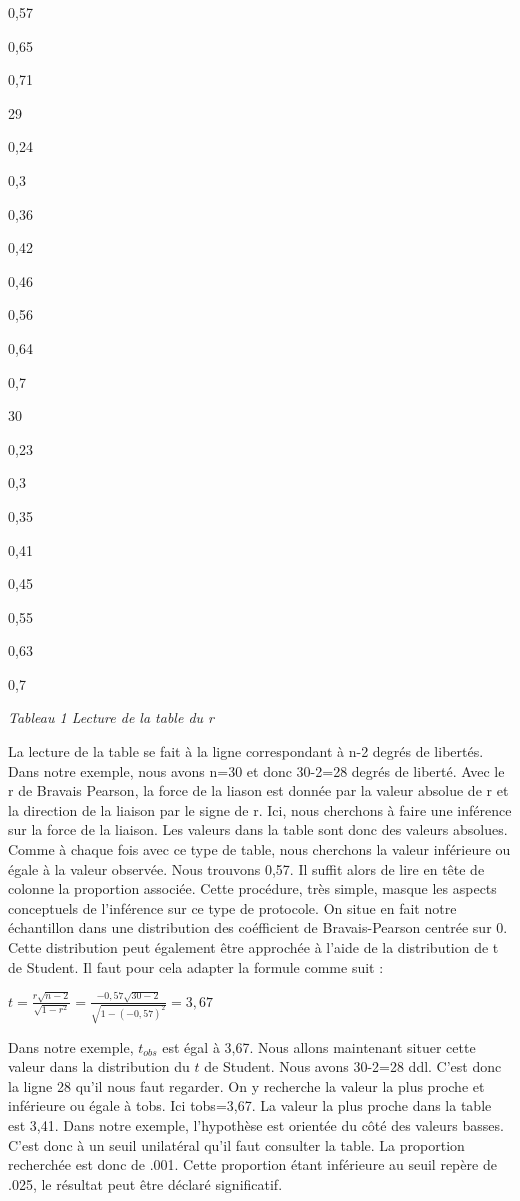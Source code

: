 \documentclass[]{book}
\theoremstyle{definition}
\theoremstyle{definition}
\theoremstyle{definition}
\theoremstyle{remark}
\begin{document}
0,57

0,65

0,71

29

0,24

0,3

0,36

0,42

0,46

0,56

0,64

0,7

30

0,23

0,3

0,35

0,41

0,45

0,55

0,63

0,7

\emph{Tableau 1 Lecture de la table du r}

La lecture de la table se fait à la ligne correspondant à n-2 degrés de
libertés. Dans notre exemple, nous avons n=30 et donc 30-2=28 degrés de
liberté. Avec le r de Bravais Pearson, la force de la liason est donnée
par la valeur absolue de r et la direction de la liaison par le signe de
r. Ici, nous cherchons à faire une inférence sur la force de la liaison.
Les valeurs dans la table sont donc des valeurs absolues. Comme à chaque
fois avec ce type de table, nous cherchons la valeur inférieure ou égale
à la valeur observée. Nous trouvons 0,57. Il suffit alors de lire en
tête de colonne la proportion associée. Cette procédure, très simple,
masque les aspects conceptuels de l'inférence sur ce type de protocole.
On situe en fait notre échantillon dans une distribution des coéfficient
de Bravais-Pearson centrée sur 0. Cette distribution peut également être
approchée à l'aide de la distribution de t de Student. Il faut pour cela
adapter la formule comme suit :

\(t = \frac{r\sqrt{n-2}}{\sqrt{1-r^{2}}} = \frac{-0,57\sqrt{30-2}}{\sqrt{1-(-0,57)^{2}}} = 3,67\)

Dans notre exemple, \(t_{obs}\) est égal à 3,67. Nous allons maintenant
situer cette valeur dans la distribution du \(t\) de Student. Nous avons
30-2=28 ddl. C'est donc la ligne 28 qu'il nous faut regarder. On y
recherche la valeur la plus proche et inférieure ou égale à tobs. Ici
tobs=3,67. La valeur la plus proche dans la table est 3,41. Dans notre
exemple, l'hypothèse est orientée du côté des valeurs basses. C'est donc
à un seuil unilatéral qu'il faut consulter la table. La proportion
recherchée est donc de .001. Cette proportion étant inférieure au seuil
repère de .025, le résultat peut être déclaré significatif.
\end{document}
